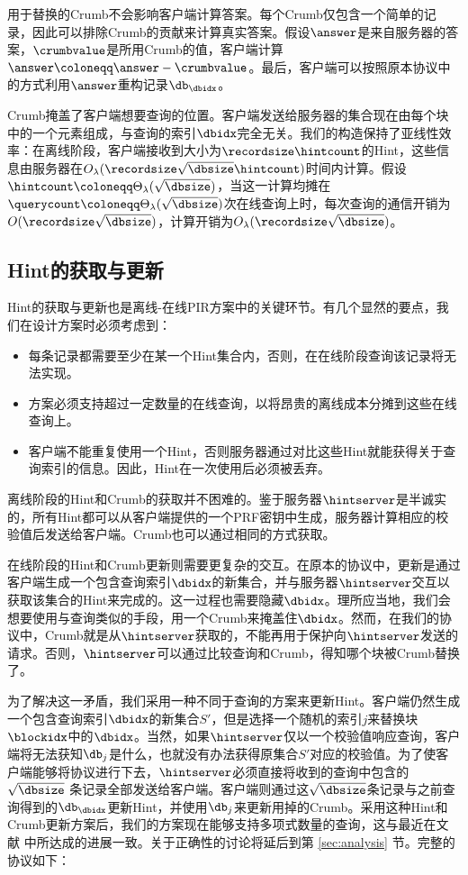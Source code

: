 用于替换的Crumb不会影响客户端计算答案。每个Crumb仅包含一个简单的记录，因此可以排除Crumb的贡献来计算真实答案。假设$\answer$是来自服务器的答案，$\crumbvalue$是所用Crumb的值，客户端计算$\answer \coloneqq \answer - \crumbvalue$。最后，客户端可以按照原本协议中的方式利用$\answer$重构记录$\db_\dbidx$。

Crumb掩盖了客户端想要查询的位置。客户端发送给服务器的集合现在由每个块中的一个元素组成，与查询的索引$\dbidx$完全无关。我们的构造保持了亚线性效率：在离线阶段，客户端接收到大小为$\recordsize\hintcount$的Hint，这些信息由服务器在$O_\lambda(\recordsize\sqrt{\dbsize}\hintcount)$时间内计算。假设$\hintcount\coloneqq \Theta_\lambda(\sqrt{\dbsize})$，当这一计算均摊在$\querycount\coloneqq\Theta_\lambda(\sqrt{\dbsize})$次在线查询上时，每次查询的通信开销为$O(\recordsize\sqrt{\dbsize})$，计算开销为$O_\lambda(\recordsize\sqrt{\dbsize})$。

\subsection{Hint的获取与更新}
Hint的获取与更新也是离线-在线PIR方案中的关键环节。有几个显然的要点，我们在设计方案时必须考虑到：
\begin{itemize}
    \item 每条记录都需要至少在某一个Hint集合内，否则，在在线阶段查询该记录将无法实现。
    \item 方案必须支持超过一定数量的在线查询，以将昂贵的离线成本分摊到这些在线查询上。
    \item 客户端不能重复使用一个Hint，否则服务器通过对比这些Hint就能获得关于查询索引的信息。因此，Hint在一次使用后必须被丢弃。
\end{itemize}

离线阶段的Hint和Crumb的获取并不困难的。鉴于服务器$\hintserver$是半诚实的，所有Hint都可以从客户端提供的一个PRF密钥中生成，服务器计算相应的校验值后发送给客户端。Crumb也可以通过相同的方式获取。

在线阶段的Hint和Crumb更新则需要更复杂的交互。在原本的协议中，更新是通过客户端生成一个包含查询索引$\dbidx$的新集合，并与服务器$\hintserver$交互以获取该集合的Hint来完成的。这一过程也需要隐藏$\dbidx$。理所应当地，我们会想要使用与查询类似的手段，用一个Crumb来掩盖住$\dbidx$。然而，在我们的协议中，Crumb就是从$\hintserver$获取的，不能再用于保护向$\hintserver$发送的请求。否则，$\hintserver$可以通过比较查询和Crumb，得知哪个块被Crumb替换了。

为了解决这一矛盾，我们采用一种不同于查询的方案来更新Hint。客户端仍然生成一个包含查询索引$\dbidx$的新集合$S'$，但是选择一个随机的索引$j$来替换块$\blockidx$中的$\dbidx$。当然，如果$\hintserver$仅以一个校验值响应查询，客户端将无法获知$\db_{j}$是什么，也就没有办法获得原集合$S'$对应的校验值。为了使客户端能够将协议进行下去，$\hintserver$必须直接将收到的查询中包含的 $\sqrt{\dbsize}$ 条记录全部发送给客户端。客户端则通过这$\sqrt{\dbsize}$条记录与之前查询得到的$\db_\dbidx$更新Hint，并使用$\db_{j}$来更新用掉的Crumb。采用这种Hint和Crumb更新方案后，我们的方案现在能够支持多项式数量的查询，这与最近在文献 \cite{C:LazPap23} 中所达成的进展一致。关于正确性的讨论将延后到第 \ref{sec:analysis} 节。完整的协议如下：

